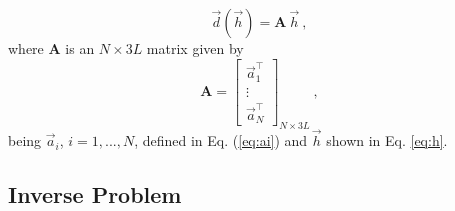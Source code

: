 \documentclass[journal abbreviation, npg]{copernicus}
\begin{document}
\begin{equation}
\vec{d}(\vec{h}) = \mathbf{A} \: \vec{h} \: ,
\label{eq:predicted-data-vector}
\end{equation}
where $\mathbf{A}$ is an $N \times 3L$ matrix given by
\begin{equation}
\mathbf{A} =
\left[
\begin{array}{c}
\vec{a}_{1}^{\intercal} \\
\vdots \\
\vec{a}_{N}^{\intercal}
\end{array}
\right]_{N \times 3L} \: ,
\label{eq:sensibility-matrix}
\end{equation}
being $\vec{a}_{i}$, $i = 1, ..., N$, defined in Eq. (\ref{eq:ai}) and $\vec{h}$ shown in Eq. \ref{eq:h}.

\subsection{Inverse Problem}
\end{document}
